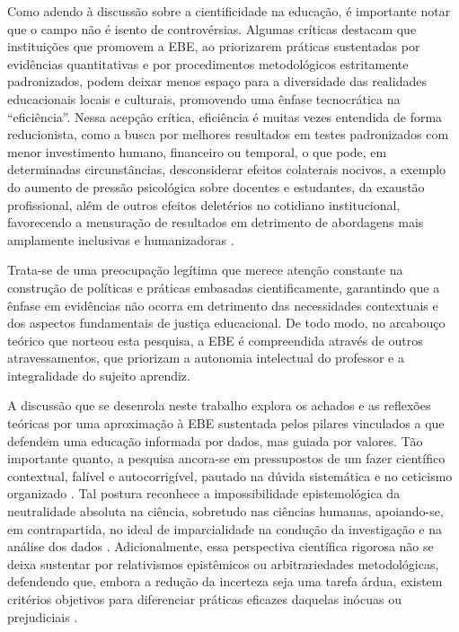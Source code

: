 \documentclass[portuguese]{textolivre}
\begin{document}
Como adendo à discussão sobre a cientificidade na educação, é importante notar que o campo não é isento de controvérsias. Algumas críticas destacam que instituições que promovem a EBE, ao priorizarem práticas sustentadas por evidências quantitativas e por procedimentos metodológicos estritamente padronizados, podem deixar menos espaço para a diversidade das realidades educacionais locais e culturais, promovendo uma ênfase tecnocrática na “eficiência”. Nessa acepção crítica, eficiência é muitas vezes entendida de forma reducionista, como a busca por melhores resultados em testes padronizados com menor investimento humano, financeiro ou temporal, o que pode, em determinadas circunstâncias, desconsiderar efeitos colaterais nocivos, a exemplo do aumento de pressão psicológica sobre docentes e estudantes, da exaustão profissional, além de outros efeitos deletérios no cotidiano institucional, favorecendo a mensuração de resultados em detrimento de abordagens mais amplamente inclusivas e humanizadoras \cite{devechi2022abordagem}.



Trata-se de uma preocupação legítima que merece atenção constante na construção de políticas e práticas embasadas cientificamente, garantindo que a ênfase em evidências não ocorra em detrimento das necessidades contextuais e dos aspectos fundamentais de justiça educacional. De todo modo, no arcabouço teórico que norteou esta pesquisa, a EBE é compreendida através de outros atravessamentos, que priorizam a autonomia intelectual do professor e a integralidade do sujeito aprendiz.

A discussão que se desenrola neste trabalho explora os achados e as reflexões teóricas por uma aproximação à EBE sustentada pelos pilares vinculados a \textcite{slavin1996education,davies1999evidence,young2016conhecimento} que defendem uma educação informada por dados, mas guiada por valores. Tão importante quanto, a pesquisa ancora-se em pressupostos de um fazer científico contextual, falível e autocorrigível, pautado na dúvida sistemática e no ceticismo organizado \cite{hansson2021pseudociencia,szczepanik2011concepcao}. Tal postura reconhece a impossibilidade epistemológica da neutralidade absoluta na ciência, sobretudo nas ciências humanas, apoiando-se, em contrapartida, no ideal de imparcialidade na condução da investigação e na análise dos dados \cite{lacey2011imparcialidade}. Adicionalmente, essa perspectiva científica rigorosa não se deixa sustentar por relativismos epistêmicos ou arbitrariedades metodológicas, defendendo que, embora a redução da incerteza seja uma tarefa árdua, existem critérios objetivos para diferenciar práticas eficazes daquelas inócuas ou prejudiciais \cite{leonardi2023ciencia}.
\end{document}
